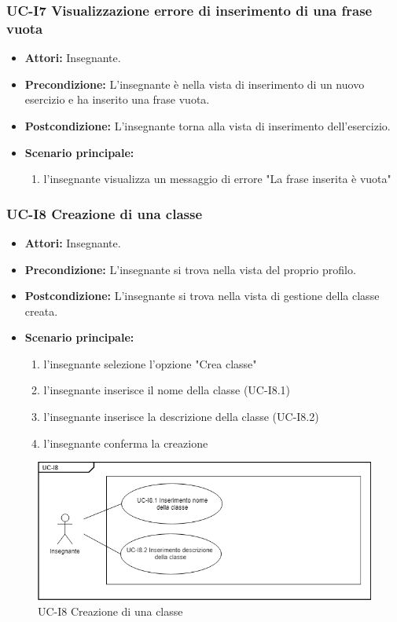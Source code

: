 \subsubsection{UC-I7 Visualizzazione errore di inserimento di una frase vuota}
\begin{itemize}
	\item \textbf{Attori:} Insegnante.
	\item \textbf{Precondizione:} L'insegnante è nella vista di inserimento di un nuovo esercizio e ha inserito una frase vuota.
	\item \textbf{Postcondizione:} L'insegnante torna alla vista di inserimento dell'esercizio.
	\item \textbf{Scenario principale:}
	\begin{enumerate}
		\item l'insegnante visualizza un messaggio di errore "La frase inserita è vuota"
	\end{enumerate}
\end{itemize}

\subsubsection{UC-I8 Creazione di una classe}
\begin{itemize}
	\item \textbf{Attori:} Insegnante.
	\item \textbf{Precondizione:} L'insegnante si trova nella vista del proprio profilo.
	\item \textbf{Postcondizione:} L'insegnante si trova nella vista di gestione della classe creata.
	\item \textbf{Scenario principale:}
	\begin{enumerate}
		\item l'insegnante selezione l'opzione "Crea classe"
		\item l'insegnante inserisce il nome della classe (UC-I8.1)
		\item l'insegnante inserisce la descrizione della classe (UC-I8.2)
		\item l'insegnante conferma la creazione
	\end{enumerate}
\end{itemize}

\begin{figure}[h]
		\centering
		\includegraphics[scale=0.7]{images/UC-I8.png}
		\caption{UC-I8 Creazione di una classe}
	\end{figure}

